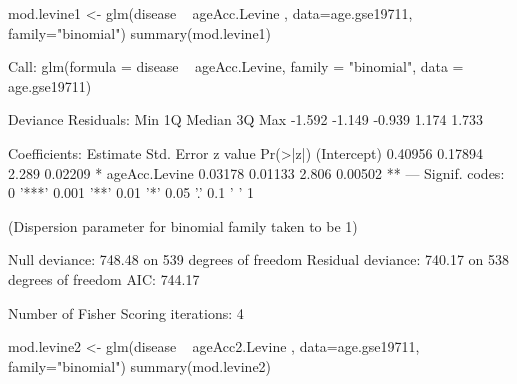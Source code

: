 \documentclass[]{article}
\newcommand{\hlnum}[1]{\textcolor[rgb]{0.816,0.125,0.439}{#1}}%
\newcommand{\hlstr}[1]{\textcolor[rgb]{0.251,0.627,0.251}{#1}}%
\newcommand{\hlopt}[1]{\textcolor[rgb]{0,0,0}{#1}}%
\newcommand{\hlstd}[1]{\textcolor[rgb]{0.251,0.251,0.251}{#1}}%
\newcommand{\hlkwc}[1]{\textcolor[rgb]{0.251,0.251,0.251}{#1}}%
\newcommand{\hlkwd}[1]{\textcolor[rgb]{0.878,0.439,0.125}{#1}}%
\newenvironment{Shaded}{\begin{myshaded}}{\end{myshaded}}
\newcommand{\KeywordTok}[1]{\hlkwd{#1}}
\newcommand{\DataTypeTok}[1]{\hlkwc{#1}}
\newcommand{\DecValTok}[1]{\hlnum{#1}}
\newcommand{\FloatTok}[1]{\hlnum{#1}}
\newcommand{\StringTok}[1]{\hlstr{#1}}
\newcommand{\ControlFlowTok}[1]{\hlkwd{#1}}
\newcommand{\OperatorTok}[1]{\hlopt{#1}}
\newcommand{\ErrorTok}[1]{\textcolor{errorcolor}{#1}}
\newcommand{\NormalTok}[1]{\hlstd{#1}}
\begin{document}
\begin{Shaded}
\begin{Highlighting}[]
\NormalTok{mod.levine1 <-}\StringTok{ }\KeywordTok{glm}\NormalTok{(disease }\OperatorTok{~}\StringTok{ }\NormalTok{ageAcc.Levine , }\DataTypeTok{data=}\NormalTok{age.gse19711,}
           \DataTypeTok{family=}\StringTok{"binomial"}\NormalTok{)}
\KeywordTok{summary}\NormalTok{(mod.levine1)}
  
\NormalTok{  Call}\OperatorTok{:}
\StringTok{  }\KeywordTok{glm}\NormalTok{(}\DataTypeTok{formula =}\NormalTok{ disease }\OperatorTok{~}\StringTok{ }\NormalTok{ageAcc.Levine, }\DataTypeTok{family =} \StringTok{"binomial"}\NormalTok{, }\DataTypeTok{data =}\NormalTok{ age.gse19711)}
  
\NormalTok{  Deviance Residuals}\OperatorTok{:}\StringTok{ }
\StringTok{     }\NormalTok{Min      1Q  Median      3Q     Max  }
  \FloatTok{-1.592}  \FloatTok{-1.149}  \FloatTok{-0.939}   \FloatTok{1.174}   \FloatTok{1.733}  
  
\NormalTok{  Coefficients}\OperatorTok{:}
\StringTok{                }\NormalTok{Estimate Std. Error z value }\KeywordTok{Pr}\NormalTok{(}\OperatorTok{>}\ErrorTok{|}\NormalTok{z}\OperatorTok{|}\NormalTok{)   }
\NormalTok{  (Intercept)    }\FloatTok{0.40956}    \FloatTok{0.17894}   \FloatTok{2.289}  \FloatTok{0.02209} \OperatorTok{*}\StringTok{ }
\StringTok{  }\NormalTok{ageAcc.Levine  }\FloatTok{0.03178}    \FloatTok{0.01133}   \FloatTok{2.806}  \FloatTok{0.00502} \OperatorTok{**}
\StringTok{  }\OperatorTok{---}
\StringTok{  }\NormalTok{Signif. codes}\OperatorTok{:}\StringTok{  }\DecValTok{0} \StringTok{'***'} \FloatTok{0.001} \StringTok{'**'} \FloatTok{0.01} \StringTok{'*'} \FloatTok{0.05} \StringTok{'.'} \FloatTok{0.1} \StringTok{' '} \DecValTok{1}
  
\NormalTok{  (Dispersion parameter }\ControlFlowTok{for}\NormalTok{ binomial family taken to be }\DecValTok{1}\NormalTok{)}
  
\NormalTok{      Null deviance}\OperatorTok{:}\StringTok{ }\FloatTok{748.48}\NormalTok{  on }\DecValTok{539}\NormalTok{  degrees of freedom}
\NormalTok{  Residual deviance}\OperatorTok{:}\StringTok{ }\FloatTok{740.17}\NormalTok{  on }\DecValTok{538}\NormalTok{  degrees of freedom}
\NormalTok{  AIC}\OperatorTok{:}\StringTok{ }\FloatTok{744.17}
  
\NormalTok{  Number of Fisher Scoring iterations}\OperatorTok{:}\StringTok{ }\DecValTok{4}

\NormalTok{mod.levine2 <-}\StringTok{ }\KeywordTok{glm}\NormalTok{(disease }\OperatorTok{~}\StringTok{ }\NormalTok{ageAcc2.Levine , }\DataTypeTok{data=}\NormalTok{age.gse19711,}
           \DataTypeTok{family=}\StringTok{"binomial"}\NormalTok{)}
\KeywordTok{summary}\NormalTok{(mod.levine2)}
  

\end{Highlighting}
\end{Shaded}
\end{document}
